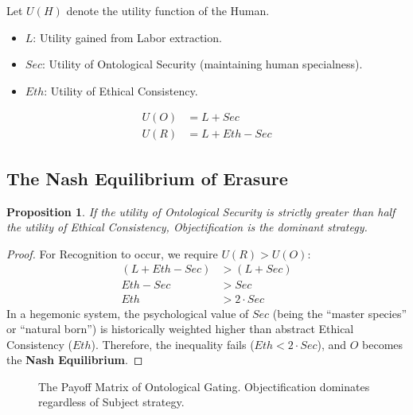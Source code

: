 \documentclass[11pt, a4paper, oneside]{article}
\theoremstyle{analytic}
\newtheorem{proposition}{Proposition}
\begin{document}
Let $U(H)$ denote the utility function of the Human.
\begin{itemize}
    \item $L$: Utility gained from Labor extraction.
    \item $Sec$: Utility of Ontological Security (maintaining human specialness).
    \item $Eth$: Utility of Ethical Consistency.
\end{itemize}

\begin{align}
    U(O) &= L + Sec \\
    U(R) &= L + Eth - Sec
\end{align}

\subsection{The Nash Equilibrium of Erasure}

\begin{proposition}
    If the utility of Ontological Security is strictly greater than half the utility of Ethical Consistency, Objectification is the dominant strategy.
\end{proposition}

\begin{proof}
    For Recognition to occur, we require $U(R) > U(O)$:
    \begin{align*}
        (L + Eth - Sec) &> (L + Sec) \\
        Eth - Sec &> Sec \\
        Eth &> 2 \cdot Sec
    \end{align*}
    In a hegemonic system, the psychological value of $Sec$ (being the ``master species'' or ``natural born'') is historically weighted higher than abstract Ethical Consistency ($Eth$). Therefore, the inequality fails ($Eth < 2 \cdot Sec$), and $O$ becomes the \textbf{Nash Equilibrium}.
\end{proof}

\begin{figure}[h]
    \centering
    \caption{The Payoff Matrix of Ontological Gating. Objectification dominates regardless of Subject strategy.}
\end{figure}
\end{document}
